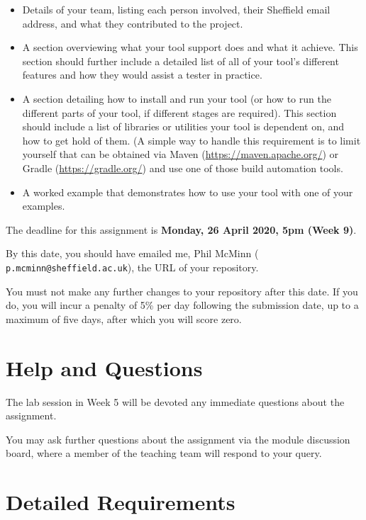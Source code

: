 \begin{itemize}
    \item Details of your team, listing each person involved, their Sheffield
    email address, and what they contributed to the project. 
    
    \item A section overviewing what your tool support does and what it achieve.
    This section should further include a detailed list of all of your tool's
    different features and how they would assist a tester in practice.

    \item A section detailing how to install and run your tool (or how to run
    the different parts of your tool, if different stages are required). This
    section should include a list of libraries or utilities your tool is
    dependent on, and how to get hold of them. (A simple way to handle this
    requirement is to limit yourself that can be obtained via Maven
    (\url{https://maven.apache.org/}) or Gradle (\url{https://gradle.org/}) and
    use one of those build automation tools. 

    \item A worked example that demonstrates how to use your tool with one of
    your examples. 
\end{itemize}

The deadline for this assignment is {\bf Monday, 26 April 2020, 5pm (Week 9)}.

By this date, you should have emailed me, Phil McMinn ({\tt
p.mcminn@sheffield.ac.uk}), the URL of your repository.

You must not make any further changes to your repository after this date. If you
do, you will incur a penalty of 5\% per day following the submission date, up to
a maximum of five days, after which you will score zero.


\section{Help and Questions}

The lab session in Week 5 will be devoted any immediate questions about the
assignment. 

You may ask further questions about the assignment via the module discussion
board, where a member of the teaching team will respond to your query.


\section{Detailed Requirements}



